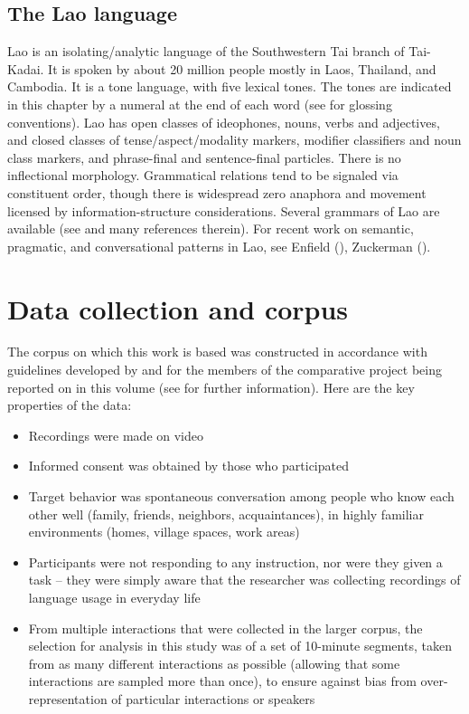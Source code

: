 \documentclass[output=paper]{langsci/langscibook}
\begin{document}
\subsection{The Lao language}
Lao is an isolating/analytic language of the Southwestern Tai branch of Tai-Kadai. It is spoken by about 20 million people mostly in Laos, Thailand, and Cambodia. It is a tone language, with five lexical tones. The tones are indicated in this chapter by a numeral at the end of each word (see \citealt{Enfield2007} for glossing conventions). Lao has open classes of ideophones, nouns, verbs and adjectives, and closed classes of tense/aspect/modality markers, modifier classifiers and noun class markers, and phrase-final and sentence-final particles. There is no inflectional morphology. Grammatical relations tend to be signaled via constituent order, though there is widespread zero anaphora and movement licensed by information-structure considerations. Several grammars of Lao are available (see \citealt{Enfield2007} and many references therein). For recent work on semantic, pragmatic, and conversational patterns in Lao, see Enfield (\citeyear{Enfield2009,Enfield2010,Enfield2013,Enfield2015a,Enfield2015b}), Zuckerman (\citeyear{zuckerman2017disrupting}).

\section{Data collection and corpus}
The corpus on which this work is based was constructed in accordance with guidelines developed by and for the members of the comparative project being reported on in this volume (see  for further information). Here are the key properties of the data:

\begin{itemize}
\item Recordings were made on video
\item Informed consent was obtained by those who participated
\item Target behavior was spontaneous conversation among people who know each other well (family, friends, neighbors, acquaintances), in highly familiar environments (homes, village spaces, work areas)
\item Participants were not responding to any instruction, nor were they given a task -- they were simply aware that the researcher was collecting recordings of language usage in everyday life
\item From multiple interactions that were collected in the larger corpus, the selection for analysis in this study was of a set of 10-minute segments, taken from as many different interactions as possible (allowing that some interactions are sampled more than once), to ensure against bias from over-representation of particular interactions or speakers
\end{itemize}
\end{document}
